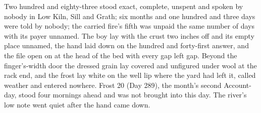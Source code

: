 Two hundred and eighty-three stood exact, complete, unspent and spoken by nobody in Low Kiln, Sill and Grath; six months and one hundred and three days were told by nobody; the carried fire's fifth was unpaid the same number of days with its payer unnamed. The boy lay with the crust two inches off and its empty place unnamed, the hand laid down on the hundred and forty-first answer, and the file open on  at the head of the bed with every gap left gap. Beyond the finger's-width door the dressed grain lay covered and unfigured under wool at the rack end, and the frost lay white on the well lip where the yard had left it, called weather and entered nowhere. Frost 20 (Day 289), the month's second Account-day, stood four mornings ahead and was not brought into this day. The river's low note went quiet after the hand came down.
